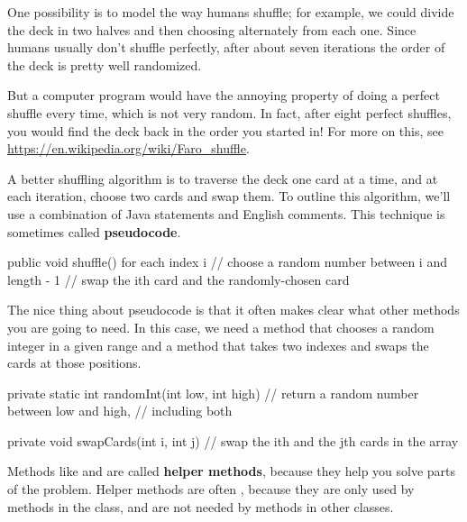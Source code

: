 One possibility is to model the way humans shuffle; for example, we could divide the deck in two halves and then choosing alternately from each one.
Since humans usually don't shuffle perfectly, after about seven iterations the order of the deck is pretty well randomized.

But a computer program would have the annoying property of doing a perfect shuffle every time, which is not very random.
In fact, after eight perfect shuffles, you would find the deck back in the order you started in!
For more on this, see \url{https://en.wikipedia.org/wiki/Faro_shuffle}.


A better shuffling algorithm is to traverse the deck one card at a time, and at each iteration, choose two cards and swap them.
To outline this algorithm, we'll use a combination of Java statements and English comments.
This technique is sometimes called {\bf pseudocode}.


\begin{code}
public void shuffle() {
    for each index i {
        // choose a random number between i and length - 1
        // swap the ith card and the randomly-chosen card
    }
}
\end{code}


The nice thing about pseudocode is that it often makes clear what other methods you are going to need.
In this case, we need a method that chooses a random integer in a given range and a method that takes two indexes and swaps the cards at those positions.

\begin{code}
private static int randomInt(int low, int high) {
    // return a random number between low and high, 
    // including both
}

private void swapCards(int i, int j) {
    // swap the ith and the jth cards in the array
}
\end{code}


Methods like  and  are called {\bf helper methods}, because they help you solve parts of the problem.
Helper methods are often , because they are only used by methods in the class, and are not needed by methods in other classes.


